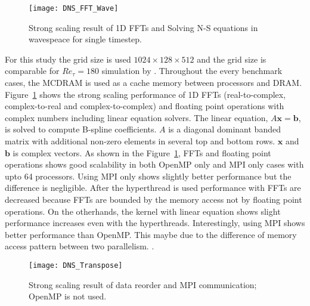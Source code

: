 \begin{figure}[htb]
 \begin{center}
   \texttt{[image: DNS\_FFT\_Wave]}
   \caption{Strong scaling result of 1D FFTs and Solving N-S equations in wavespeace for single timestep.}
   \label{fig:DNS_strong_scale_fft_wave}
 \end{center}
\end{figure}


For this study the grid size is used $1024\times128\times512$ and the grid size is comparable for $Re_\tau = 180$ simulation by \cite{Kim:1987ub}. Throughout the every benchmark cases, the MCDRAM is used as a cache memory between processors and DRAM. Figure~\ref{fig:DNS_strong_scale_fft_wave} shows the strong scaling performance of 1D FFTs (real-to-complex, complex-to-real and complex-to-complex) and floating point operations with complex numbers including linear equation solvers. The linear equation, $A\mathbf{x} = \mathbf{b}$, is solved to compute B-spline coefficients. $A$ is a diagonal dominant banded matrix with additional non-zero elements in several top and bottom rows. $\mathbf{x}$ and $\mathbf{b}$ is complex vectors. As shown in the Figure~\ref{fig:DNS_strong_scale_fft_wave}, FFTs and floating point operations shows good scalability in both OpenMP only and MPI only cases with upto 64 processors. Using MPI only shows slightly better performance but the difference is negligible. After the hyperthread is used performance with FFTs are decreased because FFTs are bounded by the memory access not by floating point operations. On the otherhands, the kernel with linear equation shows slight performance increases even with the hyperthreads. Interestingly, using MPI shows better performance than OpenMP. This maybe due to the difference of memory access pattern between two parallelism. .


\begin{figure}[htb]
 \begin{center}
   \texttt{[image: DNS\_Transpose]}
   \caption{Strong scaling result of data reorder and MPI communication; OpenMP is not used.}
   \label{fig:DNS_strong_scale_transpose}
 \end{center}
\end{figure}



